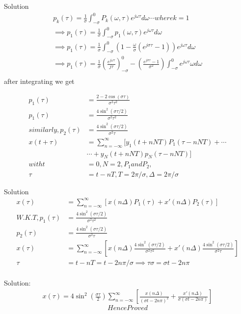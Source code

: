 \documentclass{beamer}
\begin{document}
\begin{large}
\begin{frame}
\end{frame}
\begin{frame}{Solution}
\begin{align}
    p_{k}(\tau) = \frac{1}{\sigma}\int_{-\sigma}^{0} P_{k}(\omega,\tau)e^{j\omega\tau}d\omega  \cdots
    where k = 1 \\
    \implies p_{1}(\tau) = \frac{1}{\sigma}\int_{-\sigma}^{0}p_{1}(\omega,\tau)e^{j\omega\tau}d\omega\\
    \implies p_{1}(\tau) = 
    \frac{1}{\sigma}\int_{-\sigma}^{0}(1-\frac{\omega}{\sigma}(e^{j\sigma\tau}-1))e^{j\omega\tau}d\omega\\
    \implies p_{1}(\tau) =
    \frac{1}{\sigma}(\frac{e^{j\omega\tau}}{j\tau})_{-\sigma}^{0}-(\frac{e^{j\sigma\tau}-1}{\sigma^{2}})\int_{-\sigma}^{0}e^{j\omega\tau}\omega d\omega\\
    \end{align}
    after integrating we get\\
    \end{frame}
    \begin{frame}
    \begin{align}
    p_{1}(\tau) &= \frac{2-2\cos(\sigma\tau)}{\sigma^{2}\tau^{2}}\\
    p_{1}(\tau) &= \frac{4\sin^{2}(\sigma\tau /2)}{\sigma^{2}\tau^{2}}\\
    similarly,   p_{2} (\tau)&=  \frac{4\sin^{2}(\sigma\tau /2)}{\sigma^{2}\tau}\\
  x(t+\tau) &= \sum_{n = -\infty}^{\infty}[y_{1}(t+nNT)P_{1}(\tau - nNT)+\cdots\\&\cdots+y_{N}(t+nNT)p_{N}(\tau - nNT)]\\
  with t &= 0,N = 2,P_{1} and P_{2},\\\tau &= t -   nT ,T = 2\pi /\sigma ,\Delta = 2\pi /\sigma
  \end{align}
  \end{frame}
  \begin{frame}{Solution}
  \begin{align}
  x(\tau) &= \sum_{n = -\infty}^{\infty}[{x(n\Delta)}P_{1}(\tau)+{x'(n\Delta)}P_{2}(\tau)]\\
  W.K.T,
    p_{1}(\tau) &= \frac{4\sin^{2}(\sigma\tau /2)}{\sigma^{2}\tau^{2}}\\
     p_{2} (\tau)&=  \frac{4\sin^{2}(\sigma\tau /2)}{\sigma^{2}\tau}\\
  x(\tau) &= \sum_{n=-\infty}^{\infty}[x(n\Delta)\frac{4\sin^{2}(\sigma\tau /2)}{\sigma^{2}\tau^{2}}+x'(n\Delta)\frac{4\sin^{2}(\sigma\tau /2)}{\sigma^{2}\tau}] \\
  \tau &= t - nT = t - 2n\pi/\sigma \implies \tau\sigma = \sigma t - 2n\pi\\
\end{align}
\end{frame}
\begin{frame}{Solution:}
    \begin{align}
    x(\tau) = 4\sin^{2}(\frac{\sigma\tau}{2})\sum_{n = -\infty}^{\infty}[\frac{x(n\Delta)}{(\sigma t-2n\pi)^{2}}+\frac{x'(n\Delta)}{\sigma(\sigma t - 2n\pi)}]
\end{align}
$$Hence Proved$$
\end{frame}
\end{large}
\end{document}

